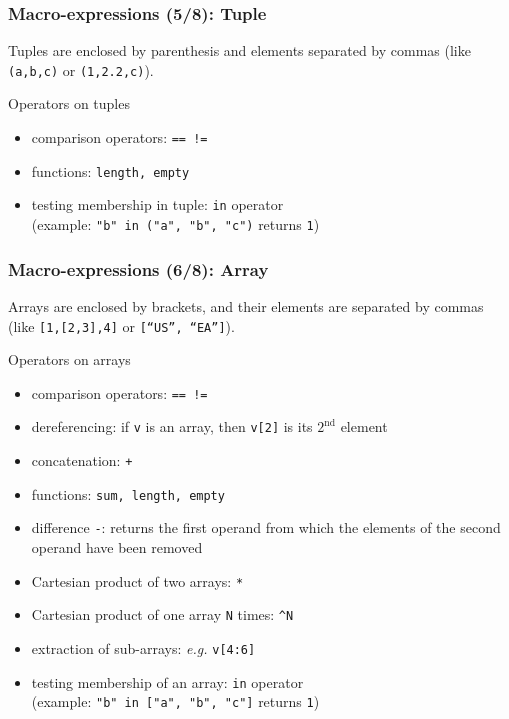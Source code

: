 \documentclass{beamer}
\begin{document}
\begin{frame}[fragile=singleslide]
  \frametitle{Macro-expressions (5/8): Tuple}
  Tuples are enclosed by parenthesis and elements separated by commas (like
  \texttt{(a,b,c)} or \texttt{(1,2.2,c)}).
  \begin{block}{Operators on tuples}
    \begin{itemize}
    \item comparison operators: \texttt{== !=}
    \item functions: \texttt{length, empty}
    \item testing membership in tuple: \texttt{in} operator \\ (example:
      \texttt{"b" in ("a", "b", "c")} returns \texttt{1})
    \end{itemize}
  \end{block}
\end{frame}

\begin{frame}[fragile=singleslide]
  \frametitle{Macro-expressions (6/8): Array}
  Arrays are enclosed by brackets, and their elements are separated by commas
  (like \texttt{[1,[2,3],4]} or \texttt{[``US'', ``EA'']}).
  \begin{block}{Operators on arrays}
    \begin{itemize}
    \item comparison operators: \texttt{== !=}
    \item dereferencing: if \texttt{v} is an array, then \texttt{v[2]} is its $2^{\textrm{nd}}$ element
    \item concatenation: \texttt{+}
    \item functions: \texttt{sum, length, empty}
    \item difference \texttt{-}: returns the first operand from which the elements of the second operand have been removed
    \item Cartesian product of two arrays: \texttt{*}
    \item Cartesian product of one array \texttt{N} times: \texttt{\^{}N}
    \item extraction of sub-arrays: \textit{e.g.} \texttt{v[4:6]}
    \item testing membership of an array: \texttt{in} operator \\ (example:
      \texttt{"b" in ["a", "b", "c"]} returns \texttt{1})
    \end{itemize}
  \end{block}
\end{frame}
\end{document}
